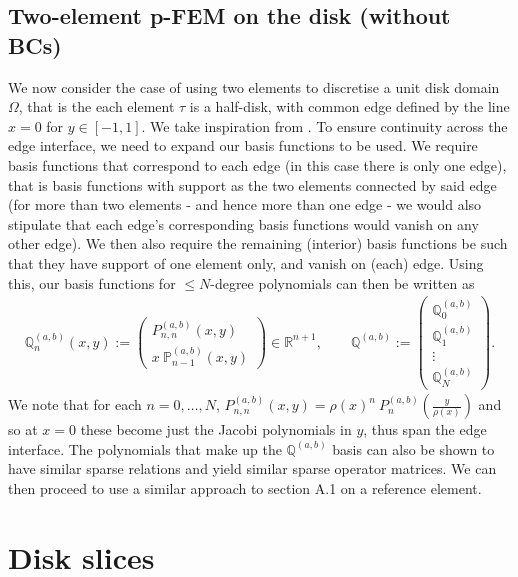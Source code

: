 \documentclass[11pt, oneside]{article}   	%
\newcommand{\R}{\mathbb{R}}
\newcommand{\bigP}{\mathbb{P}}
\newcommand{\bigPab}{\bigP^{(a,b)}}
\newcommand{\element}{\tau}
\newcommand{\bigQ}{\mathbb{Q}}
\newcommand{\bigQab}{\bigQ^{(a,b)}}
\begin{document}
\subsection{Two-element p-FEM on the disk (without BCs)}
We now consider the case of using two elements to discretise a unit disk domain $\Omega$, that is the each element $\element$ is a half-disk, with common edge defined by the line $x=0$ for $y \in [-1,1]$. We take inspiration from \cite{karniadakis2013spectral, beuchler2006new}. To ensure continuity across the edge interface, we need to expand our basis functions to be used. We require basis functions that correspond to each edge (in this case there is only one edge), that is basis functions with support as the two elements connected by said edge (for more than two elements - and hence more than one edge - we would also stipulate that each edge's corresponding basis functions would vanish on any other edge). We then also require the remaining (interior) basis functions be such that they have support of one element only, and vanish on (each) edge. Using this, our basis functions for $\le N$-degree polynomials can then be written as
\begin{align}
	\bigQab_n(x,y) := \begin{pmatrix}
		P^{(a,b)}_{n,n}(x,y) \\
		x \: \bigPab_{n-1}(x,y)
	\end{pmatrix} \in \R^{n+1}, 
	\quad \quad 
	\bigQab := \begin{pmatrix}
		\bigQab_0 \\
		\bigQab_1 \\
		\vdots \\
		\bigQab_N
	\end{pmatrix}.
\end{align}
We note that for each $n = 0,\dots,N$, $P^{(a,b)}_{n,n}(x,y) = \rho(x)^n \: P^{(a,b)}_{n}(\frac{y}{\rho(x)})$ and so at $x=0$ these become just the Jacobi polynomials in $y$, thus span the edge interface. The polynomials that make up the $\bigQab$ basis can also be shown to have similar sparse relations and yield similar sparse operator matrices. We can then proceed to use a similar approach to section A.1 on a reference element.


\section{Disk slices}
\end{document}
